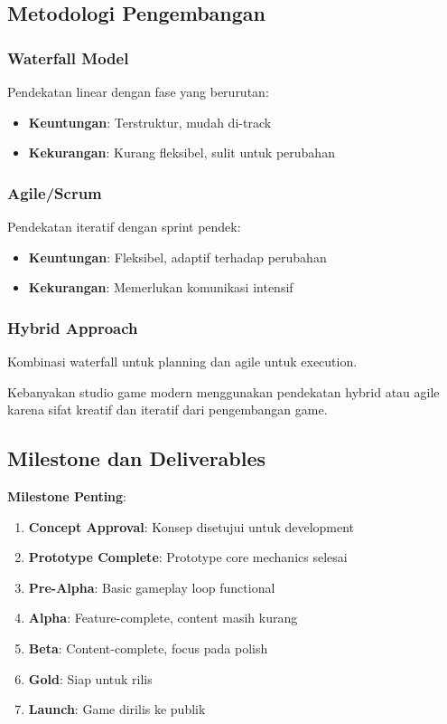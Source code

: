 \subsection{Metodologi Pengembangan}

\subsubsection{Waterfall Model}
Pendekatan linear dengan fase yang berurutan:
\begin{itemize}
\item \textbf{Keuntungan}: Terstruktur, mudah di-track
\item \textbf{Kekurangan}: Kurang fleksibel, sulit untuk perubahan
\end{itemize}

\subsubsection{Agile/Scrum}
Pendekatan iteratif dengan sprint pendek:
\begin{itemize}
\item \textbf{Keuntungan}: Fleksibel, adaptif terhadap perubahan
\item \textbf{Kekurangan}: Memerlukan komunikasi intensif
\end{itemize}

\subsubsection{Hybrid Approach}
Kombinasi waterfall untuk planning dan agile untuk execution.

\begin{catatan}
Kebanyakan studio game modern menggunakan pendekatan hybrid atau agile karena sifat kreatif dan iteratif dari pengembangan game.
\end{catatan}

\subsection{Milestone dan Deliverables}

\textbf{Milestone Penting}:
\begin{enumerate}
\item \textbf{Concept Approval}: Konsep disetujui untuk development
\item \textbf{Prototype Complete}: Prototype core mechanics selesai
\item \textbf{Pre-Alpha}: Basic gameplay loop functional
\item \textbf{Alpha}: Feature-complete, content masih kurang
\item \textbf{Beta}: Content-complete, focus pada polish
\item \textbf{Gold}: Siap untuk rilis
\item \textbf{Launch}: Game dirilis ke publik
\end{enumerate}

